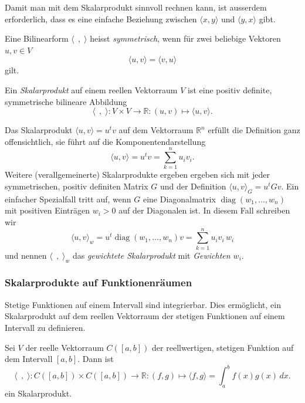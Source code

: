 Damit man mit dem Skalarprodukt sinnvoll rechnen kann, ist ausserdem
erforderlich, dass es eine einfache Beziehung zwischen 
$\langle x,y\rangle$ und $\langle y,x\rangle$ gibt.

\begin{definition}
Eine Bilinearform $\langle\;\,,\;\rangle$ heisst {\em symmetrisch}, wenn
%
für zwei beliebige Vektoren $u,v\in V$
\[
\langle u,v\rangle = \langle v,u\rangle
\]
gilt.
\end{definition}

\begin{definition}
Ein {\em Skalarprodukt} auf einem reellen Vektorraum $V$ ist eine
%
positiv definite, symmetrische bilineare Abbildung
\[
\langle\;\,,\;\rangle
\colon
V\times V
\to
\mathbb{R}
:
(u,v) \mapsto \langle u,v\rangle.
\]
\end{definition}

Das Skalarprodukt $\langle u,v\rangle=u^tv$ auf dem Vektorraum 
$\mathbb{R}^n$ erfüllt die Definition ganz offensichtlich,
sie führt auf die Komponentendarstellung
\[
\langle u,v\rangle = u^tv = \sum_{k=1}^n u_iv_i.
\]
Weitere (verallgemeinerte) Skalarprodukte ergeben ergeben sich mit
jeder symmetrischen, positiv definiten Matrix $G$ und der Definition
$\langle u,v\rangle_G=u^tGv$.
Ein einfacher Spezialfall tritt auf, wenn $G$ eine Diagonalmatrix
$\operatorname{diag}(w_1,\dots,w_n)$
mit positiven Einträgen $w_i>0$ auf der Diagonalen ist.
In diesem Fall schreiben wir
\[
\langle u,v\rangle_w
=
u^t\operatorname{diag}(w_1,\dots,w_n)v
=
\sum_{k=1}^n u_iv_i\,w_i
\]
und nennen $\langle \;\,,\;\rangle_w$ das {\em gewichtete Skalarprodukt}
mit {\em Gewichten $w_i$}.

%
%
\subsubsection{Skalarprodukte auf Funktionenräumen}
Stetige Funktionen auf einem Intervall sind integrierbar.
Dies ermöglicht, ein Skalarprodukt auf dem reellen
Vektorraum der stetigen Funktionen auf einem Intervall zu definieren.

\begin{satz}
\label{buch:orthogonal:satz:skalarprodukt}
Sei $V$ der reelle Vektorraum $C([a,b])$ der reellwertigen, stetigen
Funktion auf dem Intervall $[a,b]$.
Dann ist 
\[
\langle\;\,,\;\rangle
\colon
C([a,b]) \times C([a,b]) \to \mathbb{R}
:
(f,g) \mapsto \langle f,g\rangle = \int_a^b f(x)g(x)\,dx.
\]
ein Skalarprodukt.
\end{satz}


